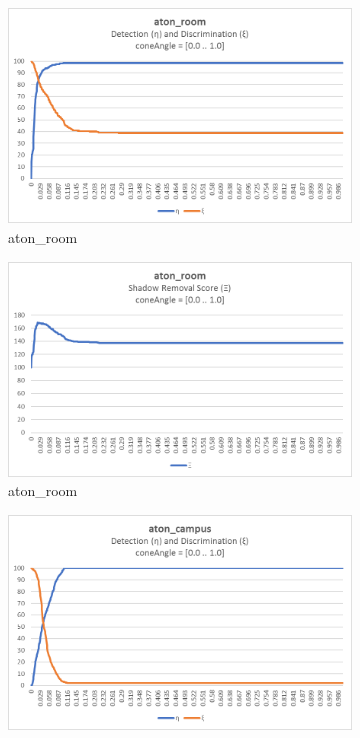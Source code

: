 \begin{appendices}
\begin{figure}
  \begin{subfigure}{.45\linewidth}
  \includegraphics[width=1\linewidth]{figures/appendix/room_coneAngle_response.jpg}
  \caption{aton\_room}
\end{subfigure}
\hfill
\begin{subfigure}{.45\linewidth}
  \includegraphics[width=1\linewidth]{figures/appendix/room_coneAngle_score.jpg}
  \caption{aton\_room}
\end{subfigure}
\hfill
\begin{subfigure}{.45\linewidth}
  \includegraphics[width=1\linewidth]{figures/appendix/campus_coneAngle_response.jpg}

\end{subfigure}
\end{figure}
\end{appendices}
